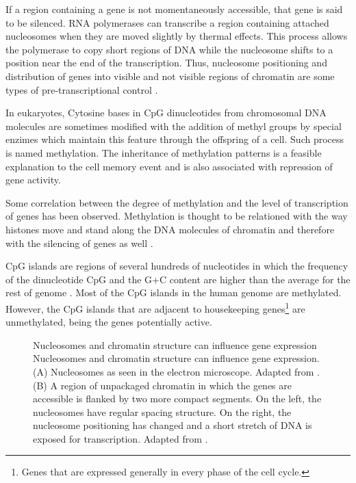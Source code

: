 If a region containing a gene is not momentaneously accessible, that gene is
said to be silenced. 
RNA polymerases can transcribe a region containing attached
nucleosomes when they are moved slightly by thermal effects. This process allows
the polymerase to copy short regions of DNA while the nucleosome shifts to
a position near the end of the transcription. Thus, nucleosome positioning
and distribution of genes into visible and not visible regions of chromatin
are some types of pre-transcriptional control \citep{brown:1999a}.


In eukaryotes, Cytosine bases in CpG dinucleotides from chromosomal DNA molecules are sometimes modified
with the addition of methyl groups by special enzimes which maintain this feature
through the offspring of a cell. Such process is named methylation. 
The inheritance of methylation patterns is a feasible explanation to the cell
memory event and is also associated with repression of gene activity.

Some correlation between the degree of methylation and the level of transcription of
genes has been observed. Methylation is thought to be relationed with the way histones
move and stand along the DNA molecules of chromatin and therefore with the silencing
of genes as well \citep{brown:1999a}.

CpG islands   
are regions of several hundreds of nucleotides in which the frequency of the dinucleotide 
CpG and the G+C content are higher than the average for the rest of genome \citep{antequera:1993a}. 
Most of the CpG islands in the human genome are methylated. However, the CpG islands
that are adjacent to housekeeping genes\footnote{Genes that are expressed generally in every phase
of the cell cycle.} are unmethylated, being the genes potentially active.

\begin{figure}[t!]
\begin{center}
\setlength{\fboxsep}{0pt}
          {Nucleosomes and chromatin structure can influence gene expression}%
          {Nucleosomes and chromatin structure can influence gene expression.}%
          {(A) Nucleosomes as seen in the electron microscope. Adapted from \citep{alberts:1994a}. (B) A region of unpackaged chromatin in which the genes are accessible is flanked by two more compact segments. On the left, the nucleosomes have regular spacing structure. On the right, the nucleosome positioning has changed and a short stretch of DNA is exposed for transcription. Adapted from \citet{brown:1999a}.}
\end{center}
\end{figure}

